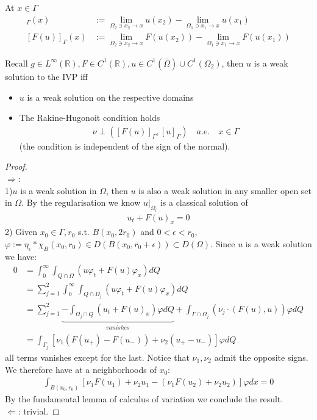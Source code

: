 \begin{definition}[jump]
	At $x \in \Gamma$ 
	\begin{align*}
		[u]_\Gamma(x)&:= \lim_{\Omega_2 \ni x_2 \rightarrow x} u(x_2) - \lim_{\Omega_1 \ni x_1 \rightarrow x} u(x_1)\\
		[F(u)]_\Gamma(x) &:= \lim_{\Omega_2 \ni x_2 \rightarrow x}F(u(x_2)) - \lim_{\Omega_1 \ni x_1 \rightarrow x} F(u(x_1))
	\end{align*}
\end{definition}

\begin{proposition}
	Recall $g \in L^\infty(\mathbb{R}), F \in C^1(\mathbb{R}), u \in C^1(\bar{\Omega})\cup C^1(\Omega_2)$, then $u$ is a weak solution to the IVP iff
	\begin{itemize}
		\item $u$ is a weak solution on the respective domains
		\item The Rakine-Hugonoit condition holds
		\begin{align*}
			\nu \perp ([F(u)]_\Gamma, [u]_\Gamma) \quad a.e. \quad x \in \Gamma
		\end{align*}
		(the condition is independent of the sign of the normal). 
	\end{itemize}
\end{proposition}
\begin{proof}
	\quad\\
	$\Rightarrow$:\\
	1)$u$ is a weak solution in $\Omega$, then $u$ is also a weak solution in any smaller open set in $\Omega$. By the regularisation we know $u|_{\Omega_i}$ is a classical solution of 
	\begin{align*}
		u_t + F(u)_x = 0
	\end{align*}
	2) Given $x_0 \in \Gamma, r_0$ s.t. $B(x_0, 2 r_0)$ and $0 < \epsilon < r_0$, $\varphi:= \eta_\epsilon * \chi_B(x_0, r_0) \in D(B(x_0, r_0 + \epsilon)) \subset D(\Omega)$. Since $u$ is a weak solution we have:
	\begin{align*}
		0 &= \int_0^\infty \int_{Q \cap \Omega} (u \varphi_t + F(u) \varphi_x) dQ\\
		&=  \sum_{j = 1}^2 \int_0^\infty \int_{Q \cap \Omega_j} (u\varphi_t + F(u) \varphi_x) dQ  \\
		&=  \sum_{j = 1}^2 \underbrace{ - \int_{\Omega_j \cap Q}  (u_t + F(u)_x)\varphi dQ}_{vanishes} + 
		\int_{\Gamma \cap \overline{\Omega_j}} (\nu_j \cdot (F(u), u)) \varphi dQ\\
		& =  \int_{\Gamma_j } [\nu_1(F(u_+ ) - F(u_-))+ \nu_2(u_+ - u_-) ] \varphi dQ
	\end{align*}
	all terms vanishes except for the last. Notice that $\nu_1, \nu_2$ admit the opposite signs. We therefore have at a neighborhoods of $x_0$:
	\begin{align*}
		\int_{B(x_0, r_0)}[ \nu_1 F(u_1) + \nu_2u_1 - (\nu_1 F(u_2) + \nu_2 u_2)] \varphi dx = 0
	\end{align*}
	By the fundamental lemma of calculus of variation we conclude the result.
	\quad\\
	$\Leftarrow$: trivial.
\end{proof}

